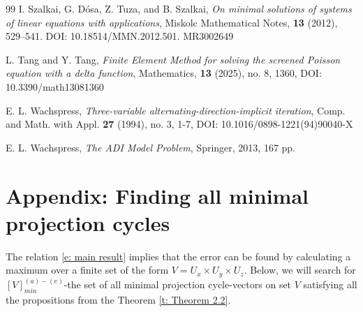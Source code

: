 \documentclass[12p]{article}
\numberwithin{equation}{section}
\begin{document}
\begin{thebibliography}{99}
I. Szalkai, G. Dósa, Z. Tuza, and B. Szalkai, {\it On minimal solutions of systems of linear equations with applications}, Miskolc Mathematical Notes, {\bf 13} (2012), 529–541. DOI: 10.18514/MMN.2012.501. MR3002649

L. Tang and Y. Tang, {\it Finite Element Method for solving the screened Poisson equation with a delta function}, Mathematics, {\bf 13} (2025), no. 8, 1360, DOI: 10.3390/math13081360

E. L. Wachspress, {\it Three-variable alternating-direction-implicit iteration}, Comp. and Math. with Appl. {\bf 27} (1994), no. 3, 1-7, DOI: 10.1016/0898-1221(94)90040-X

E. L. Wachspress, {\it The ADI Model Problem}, Springer, 2013, 167 pp.



\end{thebibliography}
\newpage
\section*{Appendix: Finding all minimal projection cycles}
The relation \eqref{e: main result} implies that the error can be found by calculating a maximum over a finite set of the form \(V=U_x \times U_y \times U_z\). Below, we will search for \([V]^{(a)-(e)}_{min}\)-the set of all minimal projection cycle-vectors on set \(V\) satisfying all the propositions from the Theorem  \ref{t: Theorem 2.2}.
 
\end{document}
